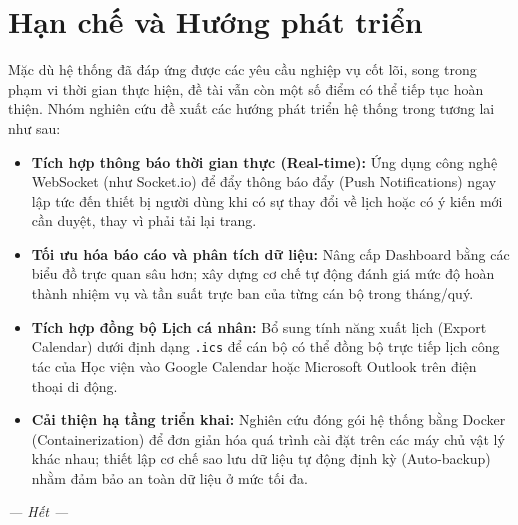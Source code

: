 \documentclass[18pt,a4paper]{report}
\begin{document}
\section{Hạn chế và Hướng phát triển}
Mặc dù hệ thống đã đáp ứng được các yêu cầu nghiệp vụ cốt lõi, song trong phạm vi thời gian thực hiện, đề tài vẫn còn một số điểm có thể tiếp tục hoàn thiện. Nhóm nghiên cứu đề xuất các hướng phát triển hệ thống trong tương lai như sau:

\begin{itemize}[leftmargin=1.2cm]
    \item \textbf{Tích hợp thông báo thời gian thực (Real-time):} Ứng dụng công nghệ WebSocket (như Socket.io) để đẩy thông báo đẩy (Push Notifications) ngay lập tức đến thiết bị người dùng khi có sự thay đổi về lịch hoặc có ý kiến mới cần duyệt, thay vì phải tải lại trang.
    \item \textbf{Tối ưu hóa báo cáo và phân tích dữ liệu:} Nâng cấp Dashboard bằng các biểu đồ trực quan sâu hơn; xây dựng cơ chế tự động đánh giá mức độ hoàn thành nhiệm vụ và tần suất trực ban của từng cán bộ trong tháng/quý.
    \item \textbf{Tích hợp đồng bộ Lịch cá nhân:} Bổ sung tính năng xuất lịch (Export Calendar) dưới định dạng \texttt{.ics} để cán bộ có thể đồng bộ trực tiếp lịch công tác của Học viện vào Google Calendar hoặc Microsoft Outlook trên điện thoại di động.
    \item \textbf{Cải thiện hạ tầng triển khai:} Nghiên cứu đóng gói hệ thống bằng Docker (Containerization) để đơn giản hóa quá trình cài đặt trên các máy chủ vật lý khác nhau; thiết lập cơ chế sao lưu dữ liệu tự động định kỳ (Auto-backup) nhằm đảm bảo an toàn dữ liệu ở mức tối đa.
\end{itemize}

\vspace{1.5cm}
\begin{center}
\textit{--- Hết ---}
\end{center}
\end{document}
